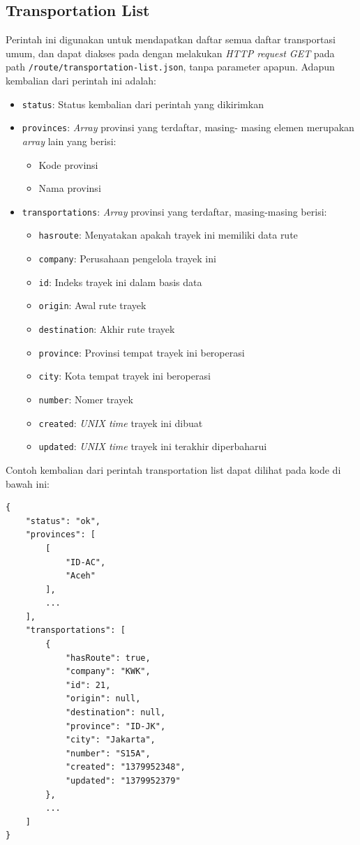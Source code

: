 \subsection{Transportation List}
Perintah ini digunakan untuk mendapatkan daftar semua daftar transportasi umum,
dan dapat diakses pada dengan melakukan \textit{HTTP request GET}
pada path \verb|/route/transportation-list.json|, tanpa parameter apapun. Adapun
kembalian dari perintah ini adalah:

\begin{itemize}
	\item \verb/status/: Status kembalian dari perintah yang dikirimkan
	\item \verb/provinces/: \textit{Array} provinsi yang terdaftar, masing-
		masing elemen merupakan \textit{array} lain yang berisi:
		\begin{itemize}
			\item Kode provinsi
			\item Nama provinsi
		\end{itemize}
	\item \verb/transportations/: \textit{Array} provinsi yang terdaftar,
		masing-masing berisi:
		\begin{itemize}
			\item \verb/hasroute/: Menyatakan apakah trayek ini memiliki data
				rute
			\item \verb/company/: Perusahaan pengelola trayek ini
			\item \verb/id/: Indeks trayek ini dalam basis data
			\item \verb/origin/: Awal rute trayek
			\item \verb/destination/: Akhir rute trayek
			\item \verb/province/: Provinsi tempat trayek ini beroperasi
			\item \verb/city/: Kota tempat trayek ini beroperasi
			\item \verb/number/: Nomer trayek
			\item \verb/created/: \textit{UNIX time} trayek ini dibuat
			\item \verb/updated/: \textit{UNIX time} trayek ini terakhir diperbaharui
		\end{itemize}
\end{itemize}

Contoh kembalian dari perintah transportation list dapat dilihat pada kode
di bawah ini:

\begin{lstlisting}
{
	"status": "ok",
	"provinces": [
		[
			"ID-AC",
			"Aceh"
		],
		...
	],
	"transportations": [
		{
			"hasRoute": true,
			"company": "KWK",
			"id": 21,
			"origin": null,
			"destination": null,
			"province": "ID-JK",
			"city": "Jakarta",
			"number": "S15A",
			"created": "1379952348",
			"updated": "1379952379"
		},
		...
	]
}
\end{lstlisting}

